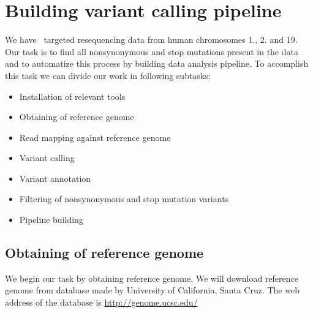\section{Building variant calling pipeline}
We have \IonTorrent~targeted resequencing data from human chromosomes 1., 2. and 19. 
Our task is to find all nonsynonymous and stop mutations present in the data
and to automatize this process by building data analysis pipeline.
To accomplish this task we can divide our work in following subtasks:
\begin{itemize}
  \item Installation of relevant tools
  \item Obtaining of reference genome
  \item Read mapping against reference genome
  \item Variant calling
  \item Variant annotation
  \item Filtering of nonsynonymous and stop mutation variants
  \item Pipeline building
\end{itemize}
\subsection{Obtaining of reference genome}
We begin our task by obtaining reference genome. We will download reference
genome from database made by University of California, Santa Cruz.
The web address of the database is \url{http://genome.ucsc.edu/}

